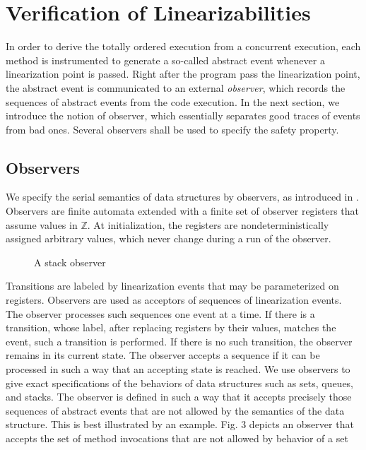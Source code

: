 \chapter{Verification of Linearizabilities}
In order to derive the totally ordered execution from a concurrent
execution, each method is instrumented to generate a so-called
abstract event whenever a linearization point is passed. Right after the program pass the linearization point, the abstract event is
communicated to an external \emph{observer}, which records the sequences of
abstract events from the code execution. In the next section, we introduce the notion of observer, which essentially separates good traces of events from bad ones. Several observers shall be used to specify the safety property.
\section*{Observers}
\label{section:observers}


We specify the serial semantics of data structures by observers, as introduced
in \cite{AHHR:integrated:rep}. Observers are finite automata extended with a finite set of observer registers that
assume values in $\mathbb Z$. At initialization, the registers are nondeterministically assigned arbitrary
values, which never change during a run of the observer. 
\vspace{1cm}
\begin{figure}[h]
  \centering
  \vspace{0.3cm}
  \caption{A stack observer}
  \label{figure:shape:set:observers}
\end{figure} \vspace{1cm} Transitions are labeled
by linearization events that may be parameterized on registers. Observers are used as
acceptors of sequences of linearization events. The observer processes such sequences
one event at a time. If there is a transition, whose label, after replacing registers by their values, matches the event, such a transition is performed. If there is no such transition,
the observer remains in its current state. The observer accepts a sequence if it can be
processed in such a way that an accepting state is reached. We use observers to give exact specifications of the behaviors of data structures such as sets, queues, and stacks. The observer is defined in such a way that it accepts
precisely those sequences of abstract events that are not allowed by the semantics of
the data structure. This is best illustrated by an example. Fig. 3 depicts an observer that
accepts the set of method invocations that are not allowed by behavior of a set 


